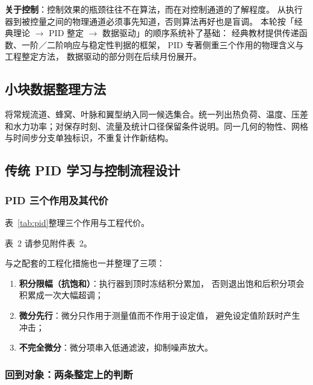 \documentclass[stage2,fontset=fandol]{ydzjreport}
\makeatletter
\newcommand{\submissionnumber}[1]{\def\@currentlabel{#1}}
\makeatother
\begin{document}
\textbf{关于控制}：控制效果的瓶颈往往不在算法，而在对控制通道的了解程度。
从执行器到被控量之间的物理通道必须事先知道，否则算法再好也是盲调。
本轮按「经典理论 $\rightarrow$ PID 整定 $\rightarrow$ 数据驱动」的顺序系统补了基础\cite{hushousong,astrom,franklin,ogata}：
经典教材提供传递函数、一阶／二阶响应与稳定性判据的框架\cite{hushousong,franklin}，
PID 专著侧重三个作用的物理含义与工程整定方法\cite{astrom}，
数据驱动的部分则在后续月份展开\cite{brunton}。


\subsection{小块数据整理方法}

将常规流道、蜂窝、叶脉和翼型纳入同一候选集合。统一列出热负荷、温度、压差和水力功率；对保存时刻、流量及统计口径保留条件说明。同一几何的物性、网格与时间步分支单独标识，不重复计作新结构。

\subsection{传统 PID 学习与控制流程设计}

\subsubsection{PID 三个作用及其代价}
表~\ref{tab:pid}整理三个作用与工程代价。


\par\noindent \begingroup\submissionnumber{2}\label{tab:pid}\endgroup 表~2 请参见附件表~2。\par


	与之配套的工程化措施也一并整理了三项：
	\begin{enumerate}
		\item \textbf{积分限幅（抗饱和）}：执行器到顶时冻结积分累加，
		否则退出饱和后积分项会积累成一次大幅超调；
		\item \textbf{微分先行}：微分只作用于测量值而不作用于设定值，
		避免设定值阶跃时产生冲击；
		\item \textbf{不完全微分}：微分项串入低通滤波，抑制噪声放大。
	\end{enumerate}

	\subsubsection{回到对象：两条整定上的判断}
\end{document}
